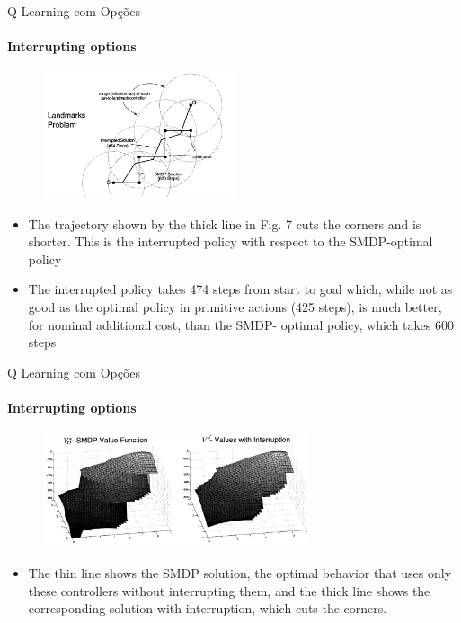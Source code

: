 \begin{frame}{Q Learning com Opções}
    \framesubtitle{Interrupting options}
    \begin{figure}
        \centering
        \includegraphics[width=0.5\textwidth]{img/landmarkProblem.png}
        \label{figLandmarkProblem}
    \end{figure}
    \begin{itemize}
        \item The trajectory shown by the thick line in Fig. 7 cuts the corners and is shorter. This is the interrupted policy with respect to the SMDP-optimal policy
        \item The interrupted policy takes 474 steps from start to goal which, while not as good as the optimal policy in primitive actions (425 steps), is much better, for nominal additional cost, than the SMDP- optimal policy, which takes 600 steps
    \end{itemize}
\end{frame}


\begin{frame}{Q Learning com Opções}
    \framesubtitle{Interrupting options}
    \begin{figure}
        \centering
        \includegraphics[width=0.7\textwidth]{img/valueFunctionInterruptingOption.png}
        \label{figLandmarkProblem}
    \end{figure}
    \begin{itemize}
        \item The thin line shows the SMDP solution, the optimal behavior that uses only these controllers without interrupting them, and the thick line shows the corresponding solution with interruption, which cuts the corners.
    \end{itemize}
\end{frame}

